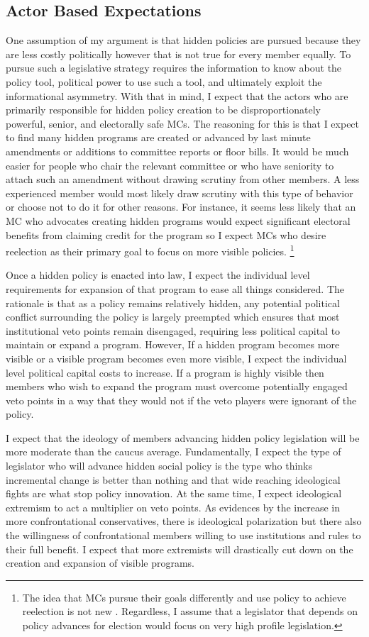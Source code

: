 \documentclass[12pt]{article}
\begin{document}
\subsection{Actor Based Expectations}
One assumption of my argument is that hidden policies are pursued because they are less costly politically however that is not true for every member equally. To pursue such a legislative strategy requires the information to know about the policy tool, political power to use such a tool, and ultimately exploit the informational asymmetry. With that in mind, I expect that the actors who are primarily responsible for hidden policy creation to be disproportionately powerful, senior, and electorally safe MCs. The reasoning for this is that I expect to find many hidden programs are created or advanced by last minute amendments or additions to committee reports or floor bills. It would be much easier for people who chair the relevant committee or who have seniority to attach such an amendment without drawing scrutiny from other members. A less experienced member would most likely draw scrutiny with this type of behavior or choose not to do it for other reasons. For instance, it seems less likely that an MC who advocates creating hidden programs would expect significant electoral benefits from claiming credit for the program so I expect MCs who desire reelection as their primary goal to focus on more visible policies. \footnote{
The idea that MCs pursue their goals differently and use policy to achieve reelection is not new \citep{fenno1973, kernell1999}. Regardless, I assume that a legislator that depends on policy advances for election would focus on very high profile legislation.} 

Once a hidden policy is enacted into law, I expect the individual level requirements for expansion of that program to ease all things considered. The rationale is that as a policy remains relatively hidden, any potential political conflict surrounding the policy is largely preempted which ensures that most institutional veto points remain disengaged, requiring less political capital to maintain or expand a program. However, If a hidden program becomes more visible or a visible program becomes even more visible, I expect the individual level political capital costs to increase. If a program is highly visible then members who wish to expand the program must overcome potentially engaged veto points in a way that they would not if the veto players were ignorant of the policy. 

I expect that the ideology of members advancing hidden policy legislation will be more moderate than the caucus average. Fundamentally, I expect the type of legislator who will advance hidden social policy is the type who thinks incremental change is better than nothing and that wide reaching ideological fights are what stop policy innovation. At the same time, I expect ideological extremism to act a multiplier on veto points. As evidences by the increase in more confrontational conservatives, there is ideological polarization but there also the willingness of confrontational members willing to use institutions and rules to their full benefit. I expect that more extremists will drastically cut down on the creation and expansion of visible programs.
\end{document}
